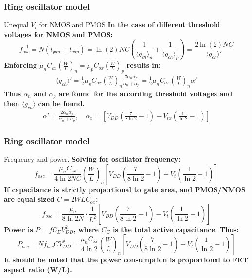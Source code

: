 \documentclass[t, screen, aspectratio=43]{beamer}
\begin{document}
\begin{frame}
	\frametitle{Ring oscillator model}
	\begin{block}{Unequal $V_t$ for NMOS and PMOS}
	\scriptsize
		\tiny
		\textbf{In the case of different threshold voltages for NMOS and PMOS:}
			\begin{equation}
				f_{osc}^{-1} = N(t_{pdn} + t_{pdp}) = \ln(2)NC\left(\frac{1}{\langle g_{ch}\rangle_n} + \frac{1}{\langle g_{ch}\rangle_p}\right) = \frac{2\ln(2)NC}{\langle g_{ch}\rangle'}
			\end{equation}	
			\textbf{Enforcing $\mu_nC_{ox}\left(\frac{W}{L}\right)_n = \mu_pC_{ox}\left(\frac{W}{L}\right)_p$ results in:}
			\begin{align}
				\langle g_{ch}\rangle' = \frac{1}{2}\mu_nC_{ox}\left(\frac{W}{L}\right)_n\frac{2 \alpha_n\alpha_p}{\alpha_n + \alpha_p} = \frac{1}{2}\mu_nC_{ox}\left(\frac{W}{L}\right)_n \alpha'
			\end{align}	
			\textbf{Thus $\alpha_n$ and $\alpha_p$ are found for the according threshold voltages and then $\langle g_{ch}\rangle$ can be found.}
			\begin{align}
				\alpha' =  \frac{2 \alpha_n\alpha_p}{\alpha_n + \alpha_p}, \hspace{1em} \alpha_x = \left[V_{DD}\left(\frac{7}{8\ln2}-1\right)-V_{tx}\left(\frac{1}{\ln2}-1\right) \right]
			\end{align}
	\end{block}
\end{frame}

\begin{frame}
	\frametitle{Ring oscillator model}
	\begin{block}{Frequency and power.}
	\scriptsize
		\tiny
		\textbf{Solving for oscillator frequency:}
			\begin{equation}
				f_{osc} = \frac{\mu_nC_{ox}}{4\ln2NC}\left(\frac{W}{L}\right)_n\left[V_{DD}\left(\frac{7}{8\ln2}-1\right)-V_t\left(\frac{1}{\ln2}-1\right) \right]
			\end{equation}
			\textbf{If capacitance is strictly proportional to gate area, and PMOS/NMOS are equal sized $C=2WLC_{ox}$:}
			\begin{equation}
				f_{osc} = \frac{\mu_n}{8\ln2N}\cdot\frac{1}{L^2}\left[V_{DD}\left(\frac{7}{8\ln2}-1\right)-V_t\left(\frac{1}{\ln2}-1\right) \right]
			\end{equation}
			\textbf{Power is $P = fC_{\Sigma}V_{DD}^2$, where $C_{\Sigma}$ is the total active capacitance. Thus:}
			\begin{equation}
				P_{osc} = Nf_{osc}CV_{DD}^2 = \frac{\mu_nC_{ox}}{4\ln2}\left(\frac{W}{L}\right)_n\left[V_{DD}\left(\frac{7}{8\ln2}-1\right)-V_t\left(\frac{1}{\ln2}-1\right) \right]
			\end{equation}
			\textbf{\color{red}It should be noted that the power consumption is proportional to FET aspect ratio (W/L).}
	\end{block}
\end{frame}
\end{document}

